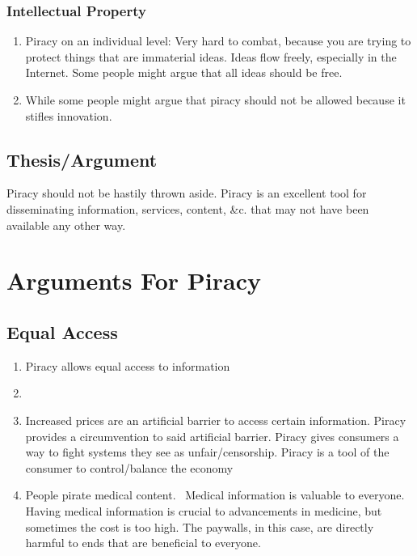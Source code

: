 \documentclass[onecolumn, 12pt]{article}
\begin{document}
\subsubsection{Intellectual Property}

\begin{enumerate}
  \item Piracy on an individual level: Very hard to combat, because you are
    trying to protect things that are immaterial ideas. Ideas flow freely,
    especially in the Internet. Some people might argue that all ideas should
    be free.

  \item While some people might argue that piracy should not be allowed because
    it stifles innovation.
\end{enumerate}

\subsection{Thesis/Argument}

Piracy should not be hastily thrown aside.
Piracy is an excellent tool for disseminating information, services, content,
\&c. that may not have been available any other way.

\section{Arguments For Piracy}

\subsection{Equal Access}

\begin{enumerate}
  \item Piracy allows equal access to information
  \item {}

  \item Increased prices are an artificial barrier to access certain
    information. Piracy provides a circumvention to said artificial barrier.
    Piracy gives consumers a way to fight systems they see as
    unfair/censorship. Piracy is a tool of the consumer to control/balance the
    economy~\cite{darnton:pirating-and-publishing, bohannon:everyone}

  \item People pirate medical content.~\cite{till:medical-literature}
    Medical information is valuable to everyone. Having medical information is
    crucial to advancements in medicine, but sometimes the cost is too high.
    The paywalls, in this case, are directly harmful to ends that are
    beneficial to everyone.
\end{enumerate}
\end{document}
